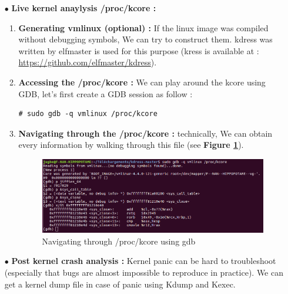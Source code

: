 \begin{itemize}
	\item[$\bullet$] \textbf{Live kernel anaylysis /proc/kcore : }
		\begin{enumerate}
			\item \textbf{Generating vmlinux (optional) : } If the linux image was compiled without debugging symbols, We can try to construct them. \og kdress \fg was written by elfmaster is used for this purpose (kress is available at : {\color{blue}\url{https://github.com/elfmaster/kdress}}).
			
			
			\item \textbf{Accessing the /proc/kcore : }  We can play around the kcore using GDB, let's first create a GDB session as follow :
	\begin{lstlisting}[style=BashInputStyle]
# sudo gdb -q vmlinux /proc/kcore
	\end{lstlisting}			

			\item \textbf{Navigating through the /proc/kcore : } technically, We can obtain every information by walking through this file (see \textbf{Figure \ref{Navigating through /proc/kcore using gdb}}).
	
	\begin{figure}[H]
		\centering
        \includegraphics[scale=0.40]{img/solution/gdb-kcore-proc-navigation.png}
        \caption{Navigating through /proc/kcore using gdb}
        \label{Navigating through /proc/kcore using gdb}
    \end{figure}		
				
		\end{enumerate}
	\item[$\bullet$] \textbf{Post kernel crash analysis : } Kernel panic can be hard to troubleshoot (especially that bugs are almost impossible to reproduce in practice). We can get a kernel dump file in case of panic using Kdump and Kexec.
	
\begin{itemize}
	

\end{itemize}
\end{itemize}
